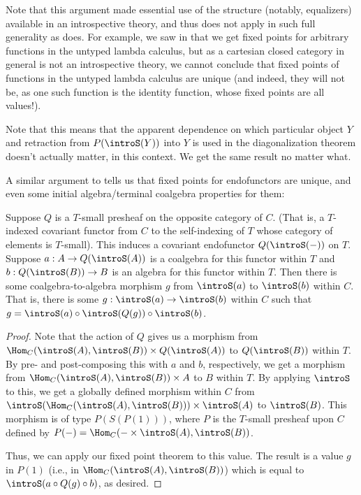 \begin{observation}
Note that this argument made essential use of the structure (notably, equalizers) available in an introspective theory, and thus does not apply in such full generality as  does. For example, we saw in  that we get fixed points for arbitrary functions in the untyped lambda calculus, but as a cartesian closed category in general is not an introspective theory, we cannot conclude that fixed points of functions in the untyped lambda calculus are unique (and indeed, they will not be, as one such function is the identity function, whose fixed points are all values!).
\end{observation}


\begin{observation}
Note that this means that the apparent dependence on which particular object $Y$ and retraction from $P(\introS(Y))$ into $Y$ is used in the diagonalization theorem doesn't actually matter, in this context. We get the same result no matter what.
\end{observation}

A similar argument to  tells us that fixed points for endofunctors are unique, and even some initial algebra/terminal coalgebra properties for them:

\begin{theorem}\label{CoalgToAlgExist}
Suppose $Q$ is a $T$-small presheaf on the opposite category of $C$. (That is, a $T$-indexed covariant functor from $C$ to the self-indexing of $T$ whose category of elements is $T$-small). This induces a covariant endofunctor $Q(\introS(-))$ on $T$. Suppose $a : A \to Q(\introS(A))$ is a coalgebra for this functor within $T$ and $b : Q(\introS(B)) \to B$ is an algebra for this functor within $T$. Then there is some coalgebra-to-algebra morphism $g$ from $\introS(a)$ to $\introS(b)$ within $C$. That is, there is some $g : \introS(a) \to \introS(b)$ within $C$ such that $g = \introS(a) \circ \introS(Q(g)) \circ \introS(b)$.
\end{theorem}
\begin{proof}
Note that the action of $Q$ gives us a morphism from $\Hom_C(\introS(A), \introS(B)) \times Q(\introS(A))$ to $Q(\introS(B))$ within $T$. By pre- and post-composing this with $a$ and $b$, respectively, we get a morphism from $\Hom_C(\introS(A), \introS(B)) \times A$ to $B$ within $T$. By applying $\introS$ to this, we get a globally defined morphism within $C$ from $\introS(\Hom_C(\introS(A), \introS(B))) \times \introS(A)$ to $\introS(B)$. This morphism is of type $P(S(P(1)))$, where $P$ is the $T$-small presheaf upon $C$ defined by $P(-) = \Hom_C(- \times \introS(A), \introS(B))$.

Thus, we can apply our fixed point theorem  to this value. The result is a value $g$ in $P(1)$ (i.e., in $\Hom_C(\introS(A), \introS(B))$) which is equal to $\introS(a \circ Q(g) \circ b)$, as desired.

\end{proof}

